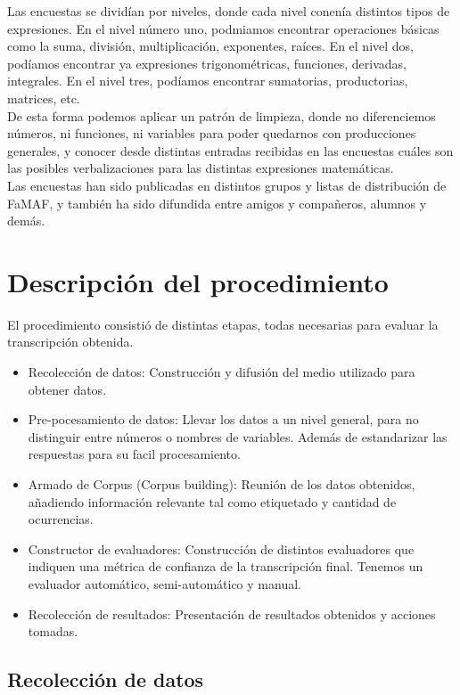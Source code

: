 Las encuestas se dividían por niveles, donde cada nivel conenía distintos tipos de expresiones.
En el nivel número uno, podmiamos encontrar operaciones básicas como la suma, división, multiplicación, exponentes, raíces.
En el nivel dos, podíamos encontrar ya expresiones trigonométricas, funciones, derivadas, integrales.
En el nivel tres, podíamos encontrar sumatorias, productorias, matrices, etc.\\

De esta forma podemos aplicar un patrón de limpieza, donde no diferenciemos números, ni funciones, ni variables para poder quedarnos con producciones generales, y conocer desde distintas entradas recibidas en las encuestas cuáles son las posibles verbalizaciones para las distintas expresiones matemáticas.\\

Las encuestas han sido publicadas en distintos grupos y listas de distribución de FaMAF, y también ha sido difundida entre amigos y compañeros, alumnos y demás.

\section{Descripción del procedimiento}

El procedimiento consistió de distintas etapas, todas necesarias para evaluar la transcripción obtenida.

\begin{itemize}
\item Recolección de datos: Construcción y difusión del medio utilizado para obtener datos.
\item Pre-pocesamiento de datos: Llevar los datos a un nivel general, para no distinguir entre números o nombres de variables. Además de estandarizar las respuestas para su facil procesamiento.
\item Armado de Corpus (Corpus building): Reunión de los datos obtenidos, añadiendo información relevante tal como etiquetado y cantidad de ocurrencias.
\item Constructor de evaluadores: Construcción de distintos evaluadores que indiquen una métrica de confianza de la transcripción final. Tenemos un evaluador automático, semi-automático y manual.
\item Recolección de resultados: Presentación de resultados obtenidos y acciones tomadas.
\end{itemize}

\subsection{Recolección de datos}

